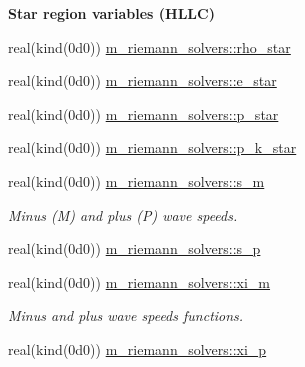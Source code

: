 \begin{Indent}\textbf{ Star region variables (H\+L\+LC)}\par
\begin{DoxyCompactItemize}
\item 
real(kind(0d0)) \hyperlink{namespacem__riemann__solvers_a6c143ed17587d6f4b1a39e1f49e030e8}{m\+\_\+riemann\+\_\+solvers\+::rho\+\_\+star}
\item 
real(kind(0d0)) \hyperlink{namespacem__riemann__solvers_a74301c7719264f4c4ca9ab6318a438cb}{m\+\_\+riemann\+\_\+solvers\+::e\+\_\+star}
\item 
real(kind(0d0)) \hyperlink{namespacem__riemann__solvers_ab48bf742ff1449dd3e044ce44cc59a56}{m\+\_\+riemann\+\_\+solvers\+::p\+\_\+star}
\item 
real(kind(0d0)) \hyperlink{namespacem__riemann__solvers_ac5dad78660af09505fe587f052afdfd5}{m\+\_\+riemann\+\_\+solvers\+::p\+\_\+k\+\_\+star}
\end{DoxyCompactItemize}
\end{Indent}
\textbf{ }\par
\begin{DoxyCompactItemize}
\item 
real(kind(0d0)) \hyperlink{namespacem__riemann__solvers_a418fedb6a95524db57eeb364db8c5c0c}{m\+\_\+riemann\+\_\+solvers\+::s\+\_\+m}
\begin{DoxyCompactList}\small\item\em Minus (M) and plus (P) wave speeds. \end{DoxyCompactList}\item 
real(kind(0d0)) \hyperlink{namespacem__riemann__solvers_ae941c64575d69a7b369f9f5bb921a384}{m\+\_\+riemann\+\_\+solvers\+::s\+\_\+p}
\end{DoxyCompactItemize}

\textbf{ }\par
\begin{DoxyCompactItemize}
\item 
real(kind(0d0)) \hyperlink{namespacem__riemann__solvers_a2da04da751b4d4e1e1d8783d80f4ebe1}{m\+\_\+riemann\+\_\+solvers\+::xi\+\_\+m}
\begin{DoxyCompactList}\small\item\em Minus and plus wave speeds functions. \end{DoxyCompactList}\item 
real(kind(0d0)) \hyperlink{namespacem__riemann__solvers_a549a425e9a863451e770d405f092417c}{m\+\_\+riemann\+\_\+solvers\+::xi\+\_\+p}
\end{DoxyCompactItemize}


